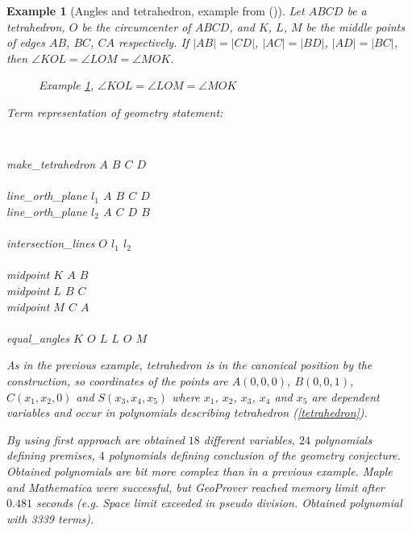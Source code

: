 \documentclass[final,1p,times,authoryear]{elsarticle}
\newtheorem{example}[theorem]{Example}
\begin{document}
\begin{example}[Angles and tetrahedron, example from (\cite{shao2016challenging})]\label{primer2}
Let $ABCD$ be a tetrahedron, $O$ be the circumcenter of $ABCD$, and
$K$, $L$, $M$ be the middle points of edges $AB$, $BC$, $CA$
respectively. If $|AB|=|CD|$, $|AC|=|BD|$, $|AD|= |BC|$, then $\angle
KOL = \angle LOM = \angle MOK$.

\begin{figure}[!hb]
\begin{center}

\end{center}
\caption{Example \ref{primer2}, $\angle KOL = \angle LOM = \angle MOK$}
\end{figure}

Term representation of geometry statement:

\begin{footnotesize}
{\tt
\begin{tabbing}
make\_tetrahedron $A$ $B$ $C$ $D$ \ \ \ \ \ \ \ \ \ \ \ \ \ \ \ \ \ \ \= \\ \\

line\_orth\_plane $l_1$ $A$ $B$ $C$ $D$ \\
line\_orth\_plane $l_2$ $A$ $C$ $D$ $B$ \\ \\

intersection\_lines $O$ $l_1$ $l_2$ \\ \\

midpoint $K$ $A$ $B$ \\
midpoint $L$ $B$ $C$ \\
midpoint $M$ $C$ $A$ \\ \\

equal\_angles  $K$ $O$ $L$ $L$ $O$ $M$
\end{tabbing}
}
\end{footnotesize}

As in the previous example, tetrahedron is in the canonical position
by the construction, so coordinates of the points are $A(0, 0, 0)$,
$B(0, 0, 1)$, $C(x_1, x_2, 0)$ and $S(x_3, x_4, x_5)$ where $x_1$,
$x_2$, $x_3$, $x_4$ and $x_5$ are dependent variables and occur in
polynomials describing tetrahedron (\ref{tetrahedron}).

By using first approach are obtained $18$ different variables, $24$
polynomials defining premises, $4$ polynomials defining conclusion of
the geometry conjecture. Obtained polynomials are bit more complex
than in a previous example. Maple and Mathematica were successful, but
GeoProver reached memory limit after $0.481$ seconds (e.g. Space limit
exceeded in pseudo division. Obtained polynomial with 3339 terms).


\end{example}
\end{document}
